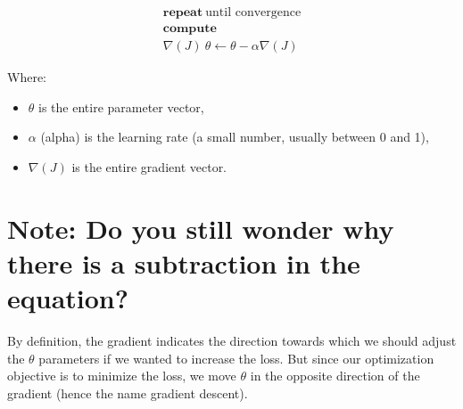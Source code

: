 $$ 
\begin{matrix}
\textbf{repeat} \ \text{until convergence} \\
\textbf{compute} \\
\nabla{(J)} \  \theta \gets \theta - \alpha \nabla(J)
\end{matrix}
$$

Where:
\begin{itemize}
    \item $\theta$ is the entire parameter vector,
    \item $\alpha$ (alpha) is the learning rate (a small number, usually between 0 and 1),
    \item $\nabla{(J)}$ is the entire gradient vector.
\end{itemize}

\section*{Note: Do you still wonder why there is a subtraction in the equation?}

By definition, the gradient indicates the direction towards which we 
should adjust the $\theta$ parameters if we wanted to increase the loss. 
But since our optimization objective is to minimize the loss,
we move $\theta$ in the opposite direction of the gradient 
(hence the name gradient descent).